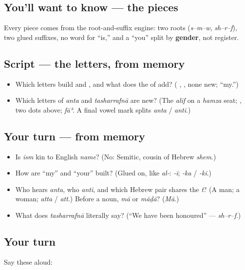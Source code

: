 \subsection*{You'll want to know — the pieces}
Every piece comes from the root-and-suffix engine: two roots (\emph{s–m–w}, \emph{sh–r–f}), two glued suffixes, no word for \textquotedblleft{}is,\textquotedblright{} and a \textquotedblleft{}you\textquotedblright{} split by \textbf{gender}, not register.

\subsection*{Script — the letters, from memory}
\begin{itemize}
\raggedright
  \item Which letters build \textbf{} and \textbf{}, and what does the \textbf{} of \textbf{} add? (\textbf{  }, \textbf{ }, none new; \textquotedblleft{}my.\textquotedblright{})
  \item Which letters of \emph{anta} and \emph{tasharrafnā} are new? (The \emph{alif} on a \emph{hamza} seat; \textbf{}, two dots above; \emph{fāʾ}. A final vowel mark splits \emph{anta} / \emph{anti}.)
\end{itemize}

\subsection*{Your turn — from memory}
\begin{itemize}
\raggedright
  \item Is \emph{ism} kin to English \emph{name}? (No: Semitic, cousin of Hebrew \emph{shem}.)
  \item How are \textquotedblleft{}my\textquotedblright{} and \textquotedblleft{}your\textquotedblright{} built? (Glued on, like \emph{al-}: \emph{-ī}; \emph{-ka} / \emph{-ki}.)
  \item Who hears \emph{anta}, who \emph{anti}, and which Hebrew pair shares the \emph{t}? (A man; a woman; \emph{atta} / \emph{att}.) Before a noun, \emph{mā} or \emph{māḏā}? (\emph{Mā}.)
  \item What does \emph{tasharrafnā} literally say? (\textquotedblleft{}We have been honoured\textquotedblright{} — \emph{sh–r–f}.)
\end{itemize}

\subsection*{Your turn}
Say these aloud:

